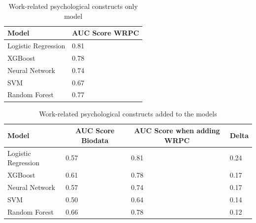 \documentclass[
  man]{apa7}
\begin{document}
\begin{table}[tbp]

\begin{center}
\begin{threeparttable}

\caption{\label{tab:wrctable}Work-related psychological constructs only model}

\begin{tabular}{ll}
\toprule
Model & \multicolumn{1}{c}{AUC Score WRPC}\\
\midrule
Logistic Regression & 0.81\\
XGBoost & 0.78\\
Neural Network & 0.74\\
SVM & 0.67\\
Random Forest & 0.77\\
\bottomrule
\end{tabular}

\end{threeparttable}
\end{center}

\end{table}

\begin{table}[tbp]

\begin{center}
\begin{threeparttable}

\caption{\label{tab:deltas}Work-related psychological constructs added to the models}

\begin{tabular}{llll}
\toprule
Model & \multicolumn{1}{c}{AUC Score Biodata} & \multicolumn{1}{c}{AUC Score when adding WRPC} & \multicolumn{1}{c}{Delta}\\
\midrule
Logistic Regression & 0.57 & 0.81 & 0.24\\
XGBoost & 0.61 & 0.78 & 0.17\\
Neural Network & 0.57 & 0.74 & 0.17\\
SVM & 0.50 & 0.64 & 0.14\\
Random Forest & 0.66 & 0.78 & 0.12\\
\bottomrule
\end{tabular}

\end{threeparttable}
\end{center}

\end{table}
\end{document}
